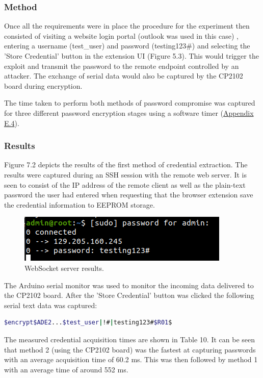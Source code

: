 \subsubsection{Method}
Once all the requirements were in place the procedure for the experiment then consisted of visiting a website login portal (outlook was used in this case) , entering a username (test\_user) and password (testing123\#) and selecting the 'Store Credential' button in the extension UI (Figure 5.3). This would trigger the exploit and transmit the password to the remote endpoint controlled by an attacker. The exchange of serial data would also be captured by the CP2102 board during encryption. 

The time taken to perform both methods of password compromise was captured for three different password encryption stages using a software timer (\hyperref[sec:timerp]{Appendix E.4}).
\subsubsection{Results}
Figure 7.2 depicts the results of the first method of credential extraction. The results were captured during an SSH session with the remote web server. It is seen to consist of the IP address of the remote client as well as the plain-text password the user had entered when requesting that the browser extension save the credential information to EEPROM storage. 

\begin{figure}[H]
\centering
\includegraphics[width=0.6\columnwidth]{Figures/Fig_28.png}
\caption{WebSocket server results.}
\label{fig:gantt}
\end{figure}

The Arduino serial monitor was used to monitor the incoming data delivered to the CP2102 board. After the 'Store Credential' button was clicked the following serial text data was captured:

\begin{lstlisting}[language=bash, frame=none]
$encrypt$ADE2...$test_user|!#|testing123#$R01$
\end{lstlisting}

The measured credential acquisition times are shown in Table 10. It can be seen that method 2 (using the CP2102 board) was the fastest at capturing passwords with an average acquisition time of 60.2 ms. This was then followed by method 1 with an average time of around 552 ms.

